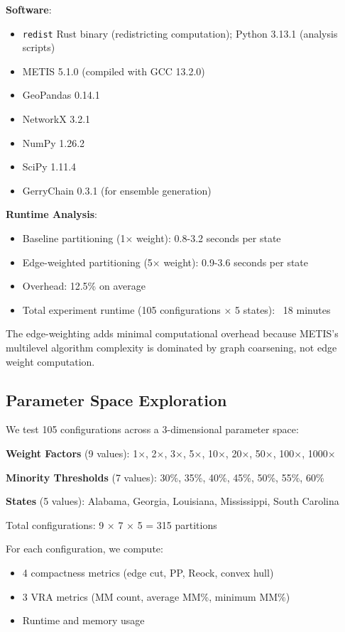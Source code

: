 {\textbf{Software}:
\begin{itemize}
    \item \texttt{redist} Rust binary (redistricting computation); Python 3.13.1 (analysis scripts)
    \item METIS 5.1.0 (compiled with GCC 13.2.0)
    \item GeoPandas 0.14.1
    \item NetworkX 3.2.1
    \item NumPy 1.26.2
    \item SciPy 1.11.4
    \item GerryChain 0.3.1 (for ensemble generation)
\end{itemize}

\textbf{Runtime Analysis}:
\begin{itemize}
    \item Baseline partitioning (1× weight): 0.8-3.2 seconds per state
    \item Edge-weighted partitioning (5× weight): 0.9-3.6 seconds per state
    \item Overhead: 12.5\% on average
    \item Total experiment runtime (105 configurations × 5 states): ~18 minutes
\end{itemize}

The edge-weighting adds minimal computational overhead because METIS's multilevel algorithm complexity is dominated by graph coarsening, not edge weight computation.

\subsection{Parameter Space Exploration}

We test 105 configurations across a 3-dimensional parameter space:

\textbf{Weight Factors} (9 values): 1×, 2×, 3×, 5×, 10×, 20×, 50×, 100×, 1000×

\textbf{Minority Thresholds} (7 values): 30\%, 35\%, 40\%, 45\%, 50\%, 55\%, 60\%

\textbf{States} (5 values): Alabama, Georgia, Louisiana, Mississippi, South Carolina

Total configurations: 9 × 7 × 5 = 315 partitions

For each configuration, we compute:
\begin{itemize}
    \item 4 compactness metrics (edge cut, PP, Reock, convex hull)
    \item 3 VRA metrics (MM count, average MM\%, minimum MM\%)
    \item Runtime and memory usage
\end{itemize}

}
